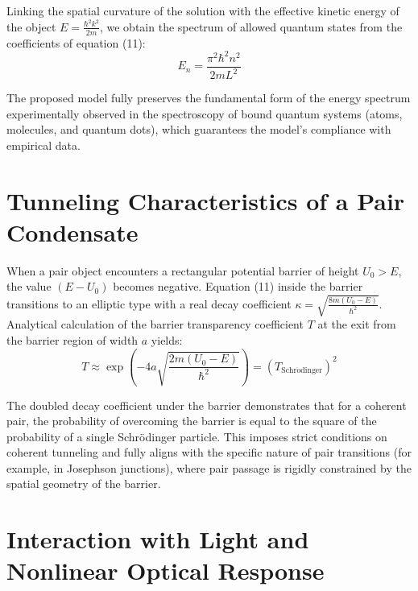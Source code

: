 \documentclass{article}
\begin{document}
Linking the spatial curvature of the solution with the effective kinetic energy of the object $E = \frac{\hbar^2 k^2}{2m}$, we obtain the spectrum of allowed quantum states from the coefficients of equation (11):
\begin{equation}
E_n = \frac{\pi^2 \hbar^2 n^2}{2mL^2}
\end{equation}

The proposed model fully preserves the fundamental form of the energy spectrum experimentally observed in the spectroscopy of bound quantum systems (atoms, molecules, and quantum dots), which guarantees the model's compliance with empirical data.

\section{Tunneling Characteristics of a Pair Condensate}
When a pair object encounters a rectangular potential barrier of height $U_0 > E$, the value $(E - U_0)$ becomes negative. Equation (11) inside the barrier transitions to an elliptic type with a real decay coefficient $\kappa = \sqrt{\frac{8m(U_0-E)}{\hbar^2}}$. Analytical calculation of the barrier transparency coefficient $T$ at the exit from the barrier region of width $a$ yields:
\begin{equation}
T \approx \exp\left(-4a\sqrt{\frac{2m(U_0 - E)}{\hbar^2}}\right) = (T_{\mathrm{Schr\ddot{o}dinger}})^2
\end{equation}

The doubled decay coefficient under the barrier demonstrates that for a coherent pair, the probability of overcoming the barrier is equal to the square of the probability of a single Schrödinger particle. This imposes strict conditions on coherent tunneling and fully aligns with the specific nature of pair transitions (for example, in Josephson junctions), where pair passage is rigidly constrained by the spatial geometry of the barrier.

\section{Interaction with Light and Nonlinear Optical Response}
\end{document}
